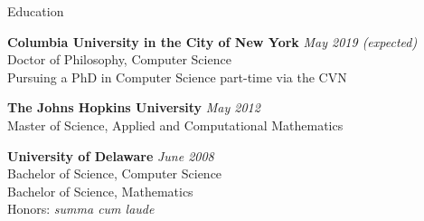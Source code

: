 \documentclass{resume} %
\begin{document}

\begin{rSection}{Education}

{\bf Columbia University in the City of New York} \hfill {\em May 2019 (expected)} \\ 
Doctor of Philosophy, Computer Science \\
Pursuing a PhD in Computer Science part-time via the CVN

{\bf The Johns Hopkins University} \hfill {\em May 2012} \\
Master of Science, Applied and Computational Mathematics

{\bf University of Delaware} \hfill {\em June 2008} \\
Bachelor of Science, Computer Science \\
Bachelor of Science, Mathematics \\
Honors: \textit{summa cum laude}

\end{rSection}

\end{document}
